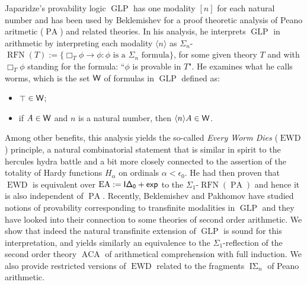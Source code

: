 \documentclass[bsl,meeting]{asl}
\newcommand{\la}{\langle}
\newcommand{\ra}{\rangle}
\DeclareMathOperator{\ea}{EA}
\DeclareMathOperator{\ewd}{EWD}
\DeclareMathOperator{\rfn}{RFN}
\DeclareMathOperator{\glp}{GLP}
\DeclareMathOperator{\aca}{ACA}
\DeclareMathOperator{\is}{I\Sigma}
\DeclareMathOperator{\pa}{PA}
\DeclareMathOperator{\monid}{\top}
\newcommand{\NP}{}
\begin{document}
\thispagestyle{empty}


\NP  
{}


Japaridze's provability logic $\glp$ has one modality $[n]$ for each natural number and has been used by Beklemishev for a proof theoretic analysis of Peano aritmetic ($\pa$) and related theories.
In his analysis, he interprets $\glp$ in arithmetic by interpreting each modality $\la n \ra $ as $\Sigma_n$-$\rfn(T):= \{ \Box_{T} \phi \to \phi : \phi \text{ is a } \Sigma_n \text{ formula} \} $, for some given theory $T$ and with $\Box_T \phi$ standing for the formula: ``$\phi$ is provable in $T$".
He examines what he calls worms, which is the set $\sf W$ of formulas in $\glp$ defined as:
\begin{itemize}
    \item $\monid \in {\sf W}$;
    \item if $A \in {\sf W}$ and $n$ is a natural number, then $\la n \ra A \in {\sf W}$.
\end{itemize}

Among other benefits, this analysis yields \cite{Beklemishev_Survey} the so-called {\em Every Worm Dies} ($\ewd$) principle, a natural combinatorial statement that is similar in spirit to the hercules hydra battle and a bit more closely connected to the assertion of the totality of Hardy functions $H_\alpha$ on ordinals $\alpha < \epsilon_0$. He had then proven that $\ewd$ is equivalent over $\sf \ea := I \Delta_0 + exp$ to the $\Sigma_1$-$\rfn(\pa)$ and hence it is also independent of $\pa$.
Recently, Beklemishev and Pakhomov \cite{Beklemishev_Pakhomov_Reflection_algebras} have studied notions of provability corresponding to transfinite modalities in $\glp$ and they have looked into their connection to some theories of second order arithmetic.
We show \cite{K.Papafil_D.Fernandez-Duque_JoostJ.Joosten_ Hyperarithmetical Worm Battles} that indeed the natural transfinite extension of $\glp$ is sound for this interpretation, and yields similarly an equivalence to the $\Sigma_1$-reflection of the second order theory $\aca$ of arithmetical comprehension with full induction.
We also provide restricted versions of $\ewd$ related to the fragments $\is_n$ of Peano arithmetic.
\end{document}
